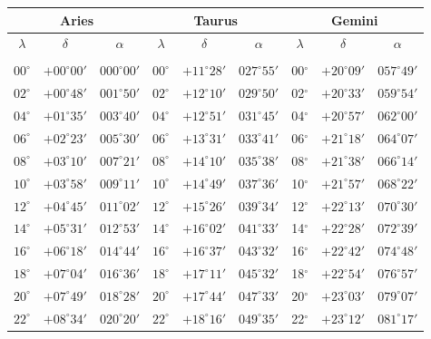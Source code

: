 \clearpage
\begin{table}[!h]
\vspace{0.25cm}
\centering
\begin{tabular}{ccc|ccc|ccc}
\multicolumn{3}{c}{Aries}\vline & \multicolumn{3}{c}{Taurus} \vline& \multicolumn{3}{c}{Gemini}\\\hline
$\lambda$& $\delta$& $\alpha$& $\lambda$& $\delta$& $\alpha$& $\lambda$& $\delta$& $\alpha$\\\hline
&&&&&&&&\\[-2ex]
$00^\circ$ & $+00^\circ00'$ & $000^\circ00'$ & $00^\circ$ & $+11^\circ28'$ & $027^\circ55'$ & 00$^\circ$ & $+20^\circ09'$ & $057^\circ49'$\\
$02^\circ$ & $+00^\circ48'$ & $001^\circ50'$ & $02^\circ$ & $+12^\circ10'$ & $029^\circ50'$ & 02$^\circ$ & $+20^\circ33'$ & $059^\circ54'$\\
$04^\circ$ & $+01^\circ35'$ & $003^\circ40'$ & $04^\circ$ & $+12^\circ51'$ & $031^\circ45'$ & 04$^\circ$ & $+20^\circ57'$ & $062^\circ00'$\\
$06^\circ$ & $+02^\circ23'$ & $005^\circ30'$ & $06^\circ$ & $+13^\circ31'$ & $033^\circ41'$ & 06$^\circ$ & $+21^\circ18'$ & $064^\circ07'$\\
$08^\circ$ & $+03^\circ10'$ & $007^\circ21'$ & $08^\circ$ & $+14^\circ10'$ & $035^\circ38'$ & 08$^\circ$ & $+21^\circ38'$ & $066^\circ14'$\\
$10^\circ$ & $+03^\circ58'$ & $009^\circ11'$ & $10^\circ$ & $+14^\circ49'$ & $037^\circ36'$ & 10$^\circ$ & $+21^\circ57'$ & $068^\circ22'$\\
$12^\circ$ & $+04^\circ45'$ & $011^\circ02'$ & $12^\circ$ & $+15^\circ26'$ & $039^\circ34'$ & 12$^\circ$ & $+22^\circ13'$ & $070^\circ30'$\\
$14^\circ$ & $+05^\circ31'$ & $012^\circ53'$ & $14^\circ$ & $+16^\circ02'$ & $041^\circ33'$ & 14$^\circ$ & $+22^\circ28'$ & $072^\circ39'$\\
$16^\circ$ & $+06^\circ18'$ & $014^\circ44'$ & $16^\circ$ & $+16^\circ37'$ & $043^\circ32'$ & 16$^\circ$ & $+22^\circ42'$ & $074^\circ48'$\\
$18^\circ$ & $+07^\circ04'$ & $016^\circ36'$ & $18^\circ$ & $+17^\circ11'$ & $045^\circ32'$ & 18$^\circ$ & $+22^\circ54'$ & $076^\circ57'$\\
$20^\circ$ & $+07^\circ49'$ & $018^\circ28'$ & $20^\circ$ & $+17^\circ44'$ & $047^\circ33'$ & 20$^\circ$ & $+23^\circ03'$ & $079^\circ07'$\\
$22^\circ$ & $+08^\circ34'$ & $020^\circ20'$ & $22^\circ$ & $+18^\circ16'$ & $049^\circ35'$ & 22$^\circ$ & $+23^\circ12'$ & $081^\circ17'$\\

\end{tabular}
\end{table}
